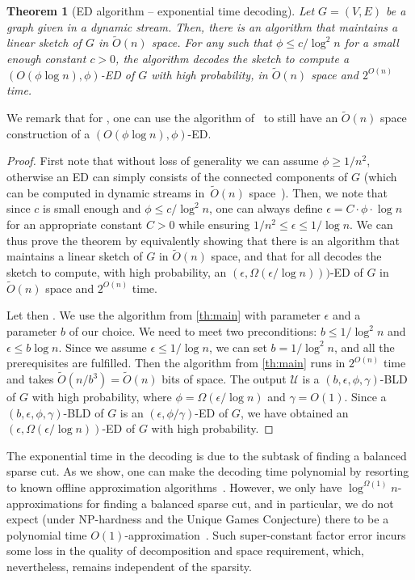 \documentclass[epsfig,letter,11pt]{article}
\numberwithin{equation}{section}
\newcommand{\otil}{\tilde{O}}
\renewcommand{\tilde}{\widetilde}
\newtheorem{mainthactual}{Theorem}
\begin{document}
\begin{mainthactual}[ED algorithm -- exponential time decoding]
	\label{cor:maingeneral}
	Let $G=(V, E)$ be a graph given in a dynamic stream. Then, there is an algorithm that maintains a linear sketch of $G$ in $\otil(n)$ space. For any   such that $ \phi \le c/\log^2 n$ for a small enough constant $c>0$, the algorithm decodes the sketch to compute a $(O(\phi \log n), \phi)$-ED of $G$ with high probability, in $\otil(n)$ space and $2^{O(n)}$ time.
\end{mainthactual}
\noindent
We remark that for , one can use the algorithm of~\cite{streamexpdec} to still have an $\otil(n)$ space construction of a $(O(\phi \log n), \phi)$-ED.
\begin{proof}
	First note that without loss of generality we can assume $\phi \ge 1/n^2$, otherwise an ED can simply consists of the connected components of $G$ (which can be computed in dynamic streams in~$\otil(n)$ space~\cite{linmeas}). Then, we note that since $c$ is small enough and $\phi \le c / \log^2 n$, one can always define $\epsilon = C \cdot \phi \cdot \log n$ for an appropriate constant $C>0$ while ensuring $1/n^2 \le \epsilon \le 1/\log n$. We can thus prove the theorem by equivalently showing that there is an algorithm that maintains a linear sketch of $G$ in $\otil(n)$ space, and that for all \smash{$\epsilon \in [{1}/{n^2},{1}/{\log n}]$} decodes the sketch to compute, with high probability, an $(\epsilon, \Omega(\epsilon / \log n)))$-ED of $G$ in $\otil(n)$ space and $2^{O(n)}$ time.
	
	Let then \smash{$\epsilon \in [{1}/{n^2},{1}/{\log n}]$}. We use the algorithm from \cref{th:main} with parameter $\epsilon$ and a parameter $b$ of our choice. We need to meet two preconditions: $b \le 1/\log^2 n$ and $\epsilon \le b \log n$. Since we assume $\epsilon \le 1/\log n$, we can set $b=1/\log^2 n$, and all the prerequisites are fulfilled. Then the algorithm from \cref{th:main} runs in $2^{O(n)}$ time and takes $\otil(n/b^3)=\otil(n)$ bits of space. The output $\mathcal{U}$ is a $(b, \epsilon, \phi, \gamma)$-BLD of $G$ with high probability, where $\phi = \Omega(\epsilon/\log n)$ and $\gamma =O(1)$. Since a $(b, \epsilon, \phi, \gamma)$-BLD of $G$ is an $(\epsilon,\phi/\gamma)$-ED of $G$, we have obtained an $(\epsilon, \Omega(\epsilon/\log n))$-ED of $G$ with high probability.
\end{proof}
\noindent
The exponential time in the decoding is due to the subtask of finding a balanced sparse cut. As we show, one can make the decoding time polynomial by resorting to known offline approximation algorithms~\cite{offlineexpdec,liexpdec}. However, we only have $\log^{\Omega(1)} n$-approximations for finding a balanced sparse cut, and in particular, we do not expect (under NP-hardness and the Unique Games Conjecture) there to be a polynomial time $O(1)$-approximation~\cite{hardsparsecut}. Such super-constant factor error incurs some loss in the quality of decomposition and space requirement, which, nevertheless, remains independent of the sparsity.
\end{document}
